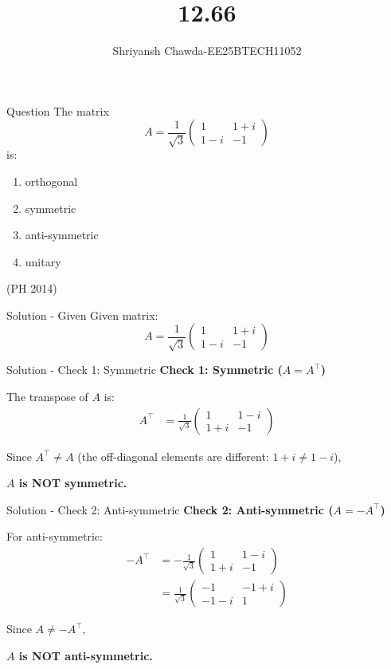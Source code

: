 \documentclass{beamer}
\title{12.66}
\author{Shriyansh Chawda-EE25BTECH11052}
\newcommand{\myvec}[1]{\ensuremath{\begin{pmatrix}#1\end{pmatrix}}}
\begin{document}
	
	\frame{\titlepage}
	
	\begin{frame}{Question}
		The matrix
		\[
		A = \frac{1}{\sqrt{3}}\myvec{1 & 1+i \\ 1-i & -1}
		\]
		is:
		\begin{enumerate}
			\item orthogonal
			\item symmetric
			\item anti-symmetric
			\item unitary
		\end{enumerate}
		\hfill{(PH 2014)}
	\end{frame}
	
	\begin{frame}{Solution - Given}
		Given matrix:
		\begin{equation}
			A = \frac{1}{\sqrt{3}}\myvec{1 & 1+i \\ 1-i & -1}
		\end{equation}
	\end{frame}
	
	\begin{frame}{Solution - Check 1: Symmetric}
		\textbf{Check 1: Symmetric ($A = A^\top$)}
		
		The transpose of $A$ is:
		\begin{align}
			A^\top &= \frac{1}{\sqrt{3}}\myvec{1 & 1-i \\ 1+i & -1}
		\end{align}
		
		Since $A^\top \neq A$ (the off-diagonal elements are different: $1+i \neq 1-i$),
		
		\vspace{0.5em}
		\textbf{$A$ is NOT symmetric.}
	\end{frame}
	
	\begin{frame}{Solution - Check 2: Anti-symmetric}
		\textbf{Check 2: Anti-symmetric ($A = -A^\top$)}
		
		For anti-symmetric:
		\begin{align}
			-A^\top &= -\frac{1}{\sqrt{3}}\myvec{1 & 1-i \\ 1+i & -1}\\
			&= \frac{1}{\sqrt{3}}\myvec{-1 & -1+i \\ -1-i & 1}
		\end{align}
		
		Since $A \neq -A^\top$,
		
		\vspace{0.5em}
		\textbf{$A$ is NOT anti-symmetric.}
	\end{frame}
	
\end{document}
